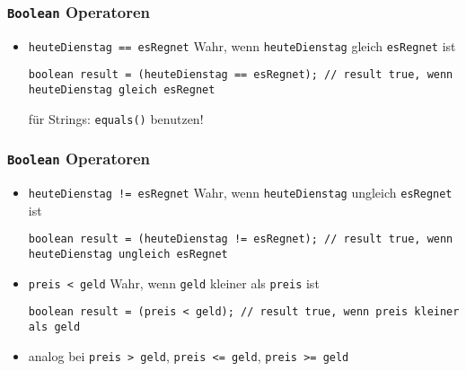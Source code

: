 \documentclass{../../presentation}
\begin{document}
\begin{frame}[fragile]
  \frametitle{\texttt{Boolean} Operatoren}
  \pause

  \begin{itemize}
    \item<2->\texttt{heuteDienstag == esRegnet} \quad Wahr, wenn \texttt{heuteDienstag} gleich \texttt{esRegnet} ist
          \begin{verbatim}
boolean result = (heuteDienstag == esRegnet); // result true, wenn heuteDienstag gleich esRegnet
    \end{verbatim}
          \achtung für Strings: \texttt{equals()} benutzen!

  \end{itemize}
\end{frame}

\begin{frame}[fragile]
  \frametitle{\texttt{Boolean} Operatoren}
  \pause

  \begin{itemize}
    \item<1->\texttt{heuteDienstag != esRegnet} \quad Wahr, wenn \texttt{heuteDienstag} ungleich \texttt{esRegnet} ist
          \begin{verbatim}
boolean result = (heuteDienstag != esRegnet); // result true, wenn heuteDienstag ungleich esRegnet
    \end{verbatim}

    \item<3->\texttt{preis < geld} \quad Wahr, wenn \texttt{geld} kleiner als \texttt{preis} ist
          \begin{verbatim}
boolean result = (preis < geld); // result true, wenn preis kleiner als geld
    \end{verbatim}

    \item<4->analog bei \texttt{preis > geld}, \texttt{preis <= geld}, \texttt{preis >= geld} \quad
  \end{itemize}
\end{frame}
\end{document}

